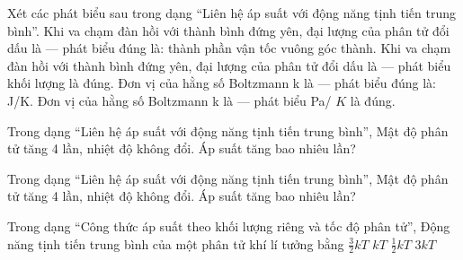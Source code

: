 \begin{ex}
Xét các phát biểu sau trong dạng “Liên hệ áp suất với động năng tịnh tiến trung bình”.
\choiceTF
{\True Khi va chạm đàn hồi với thành bình đứng yên, đại lượng của phân tử đổi dấu là — phát biểu đúng là: thành phần vận tốc vuông góc thành.}
{Khi va chạm đàn hồi với thành bình đứng yên, đại lượng của phân tử đổi dấu là — phát biểu khối lượng là đúng.}
{\True Đơn vị của hằng số Boltzmann k là — phát biểu đúng là: J/K.}
{Đơn vị của hằng số Boltzmann k là — phát biểu Pa/ $K$ là đúng.}
\end{ex}

\begin{bt}
Trong dạng “Liên hệ áp suất với động năng tịnh tiến trung bình”, Mật độ phân tử tăng 4 lần, nhiệt độ không đổi. Áp suất tăng bao nhiêu lần?
\end{bt}

\begin{ex}
Trong dạng “Liên hệ áp suất với động năng tịnh tiến trung bình”, Mật độ phân tử tăng 4 lần, nhiệt độ không đổi. Áp suất tăng bao nhiêu lần?
\end{ex}

\begin{ex}
Trong dạng “Công thức áp suất theo khối lượng riêng và tốc độ phân tử”, Động năng tịnh tiến trung bình của một phân tử khí lí tưởng bằng
\choice
{\True $\frac32kT$}
{$kT$}
{$\frac12kT$}
{$3kT$}
\end{ex}

